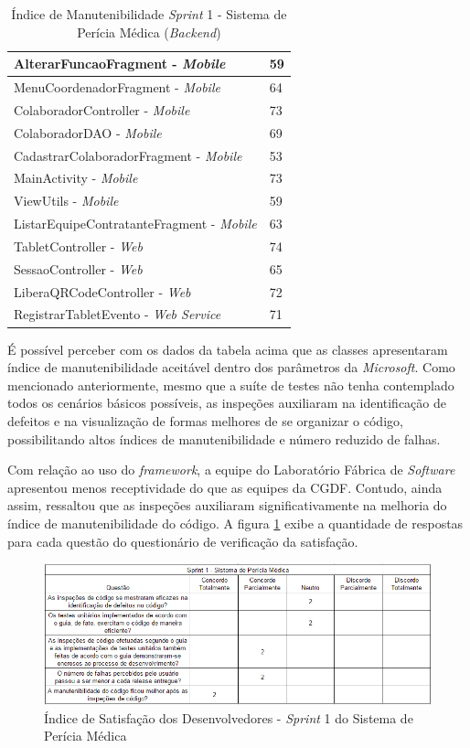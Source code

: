 \begin{table}[h]
\caption{Índice de Manutenibilidade \textit{Sprint} 1 - Sistema de Perícia Médica (\textit{Backend})}
\centering
\begin{tabular}{ | m{12cm} | m{4cm} | } 
\hline
AlterarFuncaoFragment - \textit{Mobile} & 59 \\ 
\hline
MenuCoordenadorFragment - \textit{Mobile} & 64 \\ 
\hline
ColaboradorController - \textit{Mobile} & 73 \\ 
\hline
ColaboradorDAO - \textit{Mobile} & 69 \\ 
\hline
CadastrarColaboradorFragment - \textit{Mobile} & 53 \\
\hline
MainActivity - \textit{Mobile} & 73 \\
\hline
ViewUtils - \textit{Mobile} & 59 \\
\hline
ListarEquipeContratanteFragment - \textit{Mobile} & 63 \\
\hline
TabletController - \textit{Web} & 74 \\
\hline
SessaoController - \textit{Web} & 65 \\
\hline
LiberaQRCodeController - \textit{Web} & 72 \\
\hline
RegistrarTabletEvento - \textit{Web Service} & 71 \\
\hline
\end{tabular}
\label{table:tabela10}
\end{table}

É possível perceber com os dados da tabela acima que as classes apresentaram índice de manutenibilidade aceitável dentro dos parâmetros da \textit{Microsoft}. Como mencionado anteriormente, mesmo que a suíte de testes não tenha contemplado todos os cenários básicos possíveis, as inspeções auxiliaram na identificação de defeitos e na visualização de formas melhores de se organizar o código, possibilitando altos índices de manutenibilidade e número reduzido de falhas.

Com relação ao uso do \textit{framework}, a equipe do Laboratório Fábrica de \textit{Software} apresentou menos receptividade do que as equipes da CGDF. Contudo, ainda assim, ressaltou que as inspeções auxiliaram significativamente na melhoria do índice de manutenibilidade do código. A figura \ref{fig:satisfacaoPericia1} exibe a quantidade de respostas para cada questão do questionário de verificação da satisfação.

\begin{figure}[h]
\includegraphics[width=\textwidth]{figuras/isd_pericia_1.png}
\caption{Índice de Satisfação dos Desenvolvedores - \textit{Sprint} 1 do Sistema de Perícia Médica}
\label{fig:satisfacaoPericia1}
\end{figure}

